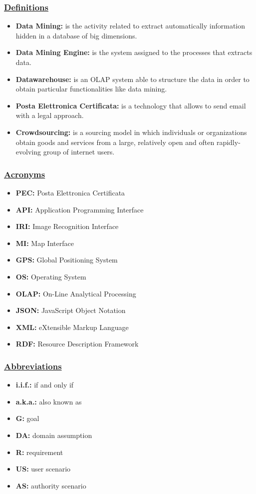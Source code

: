 	\subsubsection[Definitions]{\hyperlink{toc}{Definitions}}
		\begin{itemize}
			\item \textbf{Data Mining:} is the activity related to extract automatically information hidden in a database of big dimensions.
			\item \textbf{Data Mining Engine:} is the system assigned to the processes that extracts data. 
			\item \textbf{Datawarehouse:} is an OLAP system able to structure the data in order to obtain particular functionalities like data mining.
			\item \textbf{Posta Elettronica Certificata:} is a technology that allows to send email with a legal approach.
			\item \textbf{Crowdsourcing:} is a sourcing model in which individuals or organizations obtain goods and services from a large, relatively open and often rapidly-evolving group of internet users.
		\end{itemize}
	\subsubsection[Acronyms]{\hyperlink{toc}{Acronyms}}
		\begin{itemize}
			\item \textbf{PEC:} Posta Elettronica Certificata
			\item \textbf{API:} Application Programming Interface
			\item \textbf{IRI:} Image Recognition Interface
			\item \textbf{MI:} Map Interface
			\item \textbf{GPS:} Global Positioning System
			\item \textbf{OS:} Operating System
			\item \textbf{OLAP:} On-Line Analytical Processing
			\item \textbf{JSON:} JavaScript Object Notation
			\item \textbf{XML:} eXtensible Markup Language
			\item \textbf{RDF:} Resource Description Framework
		\end{itemize}
	\subsubsection[Abbreviations]{\hyperlink{toc}{Abbreviations}}
		\begin{itemize}
	        \item \textbf{i.i.f.:} if and only if
	        \item \textbf{a.k.a.:} also known as
			\item \textbf{G:} goal
			\item \textbf{DA:} domain assumption
			\item \textbf{R:} requirement
			\item \textbf{US:} user scenario
			\item \textbf{AS:} authority scenario
		\end{itemize}
		
